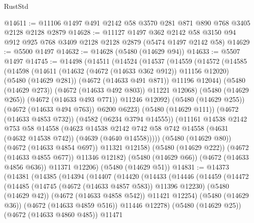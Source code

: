 \begin{lexlean}{RustStd}
\begin{coremodule}
@14611 := @11106 @1497 @491 @2142 @58 @3570 @281 @871 @890 @768 @3405 @2128 @2128 @2879
@14628 := @11127
    @1497
    @362
    @2142
    @58
    @3150
    @94
    @912
    @925
    @768
    @3409
    @2128
    @2128
    @2879
    (@5474 @1497 @2142 @58)
@14629 := @5500 @1497
@14632 := @14628 (@5480 (@14629 @94))
@14633 := @5507 @1497
@14745 := @14498
    (@14511
      (@14524
        (@14537
          (@14559
            (@14572
              (@14585
                (@14598
                  (@14611
                    (@14632 (@4672 (@14633 @362 @912)) @11156 @12020)
                    (@5480 (@14629 @281))
                    (@4672 (@14633 @491 @871))
                    @11196
                    @12044)
                  (@5480 (@14629 @273))
                  (@4672 (@14633 @492 @803))
                  @11221
                  @12068)
                (@5480 (@14629 @265))
                (@4672 (@14633 @493 @771))
                @11246
                @12092)
              (@5480 (@14629 @255))
              (@4672 (@14633 @494 @763))
              @6200
              @6223)
            (@5480 (@14629 @111))
            (@4672 (@14633 @4853 @732))
            (@4582 (@6234 @3794 @14555))
            (@11161
              @14538
              @2142
              @753
              @58
              @14558
              (@4623
                @14538
                @2142
                @742
                @58
                @742
                @14558
                (@4631 (@4632 @14538 @742))
                (@4639 (@4640 @14558)))))
          (@5480 (@14629 @80))
          (@4672 (@14633 @4854 @697))
          @11321
          @12158)
        (@5480 (@14629 @222))
        (@4672 (@14633 @4855 @677))
        @11346
        @12182)
      (@5480 (@14629 @66))
      (@4672 (@14633 @4856 @636))
      @11371
      @12206)
    (@5480 (@14629 @51))
@14831 := @14373
    (@14381
      (@14385
        (@14394
          (@14407
            (@14420
              (@14433
                (@14446
                  (@14459
                    (@14472
                      (@14485
                        (@14745 (@4672 (@14633 @4857 @583)) @11396 @12230)
                        (@5480 (@14629 @42))
                        (@4672 (@14633 @4858 @542))
                        @11421
                        @12254)
                      (@5480 (@14629 @36))
                      (@4672 (@14633 @4859 @516))
                      @11446
                      @12278)
                    (@5480 (@14629 @25))
                    (@4672 (@14633 @4860 @485))
                    @11471

\end{coremodule}
\end{lexlean}
